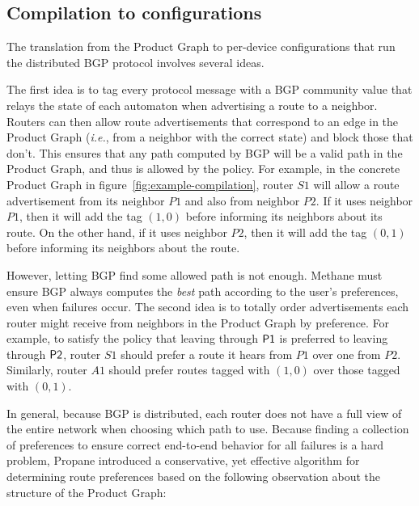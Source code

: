 \documentclass{sig-alternate-10pt}
\newcommand{\ryan}[1]{\textcolor{green}{[ryan: #1]}}
\newcommand{\IE}{\emph{i.e.}}
\newcommand{\sysname}{{\small \sf Methane}\xspace}
\begin{document}
\subsection{Compilation to configurations}

The translation from the Product Graph to per-device configurations that run the distributed BGP protocol involves several ideas. 

The first idea is to tag every protocol message with a BGP community value that relays the state of each automaton when advertising a route to a neighbor. Routers can then allow route advertisements that correspond to an edge in the Product Graph (\IE, from a neighbor with the correct state) and block those that don't. This ensures that any path computed by BGP will be a valid path in the Product Graph, and thus is allowed by the policy. For example, in the concrete Product Graph in figure~\ref{fig:example-compilation}, router $S1$ will allow a route advertisement from its neighbor $P1$ and also from neighbor $P2$. If it uses neighbor $P1$, then it will add the tag $(1,0)$ before informing its neighbors about its route. On the other hand, if it uses neighbor $P2$, then it will add the tag $(0,1)$ before informing its neighbors about the route.


However, letting BGP find some allowed path is not enough. \sysname must ensure BGP always computes the \emph{best} path according to the user's preferences, even when failures occur. The second idea is to totally order advertisements each router might receive from neighbors in the Product Graph by preference. For example, to satisfy the policy that leaving through $\sf{P1}$ is preferred to leaving through $\sf{P2}$, router $S1$ should prefer a route it hears from $P1$ over one from $P2$. Similarly, router $A1$ should prefer routes tagged with $(1,0)$ over those tagged with $(0,1)$.

In general, because BGP is distributed, each router does not have a full view of the entire network when choosing which path to use. Because finding a collection of preferences to ensure correct end-to-end behavior for all failures is a hard problem, Propane introduced a conservative, yet effective algorithm for determining route preferences based on the following observation about the structure of the Product Graph:
\end{document}
